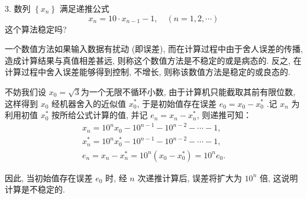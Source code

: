 \begin{tcolorbox}[breakable,enhanced,arc=0mm,outer arc=0mm,
		boxrule=0pt,toprule=1pt,leftrule=0pt,bottomrule=1pt, rightrule=0pt,left=0.2cm,right=0.2cm,
		titlerule=0.5em,toptitle=0.1cm,bottomtitle=-0.1cm,top=0.2cm,
		colframe=white!10!biru,colback=white!90!biru,coltitle=white,
            coltext=black,title =2024-03-05, title style={white!10!biru}, before skip=8pt, after skip=8pt,before upper=\hspace{2em},
		fonttitle=\bfseries,fontupper=\normalsize]
  
3. 数列 $ \left\{x_{n}\right\} $ 满足递推公式
$$
x_{n}=10 \cdot x_{n-1}-1, \quad(n=1,2, \cdots)
$$
这个算法稳定吗?
 \tcblower

一个数值方法如果输入数据有扰动 (即误差), 而在计算过程中由于舍人误差的传播, 造成计算结果与真值相差甚远, 则称这个数值方法是不稳定的或是病态的. 反之, 在计算过程中舍入误差能够得到控制, 不增长, 则称该数值方法是稳定的或良态的.

不妨我们设 $ x_{0}=\sqrt{3} $为一个无限不循环小数, 由于计算机只能截取其前有限位数, 这样得到 $ x_{0} $ 经机器舍入的近似值 $ x_{0}^* $, 于是初始值存在误差 $ e_{0}=x_0-x_0^* $ .记 $ x_{n} $ 为利用初值 $ x_{0}^* $ 按所给公式计算的值, 并记 $ e_{n} =x_{n}-x_{n}^* $, 则递推可知：
$$
\begin{array}{l}
x_{n}=10^{n} x_{0}-10^{n-1}-10^{n-2}-\cdots-1, \\
x_{n}^*=10^{n} x_{0}^*-10^{n-1}-10^{n-2}-\cdots-1, \\
e_{n}=x_{n}-x_{n}^*=10^{n}\left(x_{0}-x_{0}^*\right)=10^{n} e_{0} .
\end{array}
$$

因此, 当初始值存在误差 $ e_{0} $ 时, 经 $ n $ 次递推计算后, 误差将扩大为 $ 10^{n} $ 倍, 这说明计算是不稳定的. 


\end{tcolorbox}

\newpage


